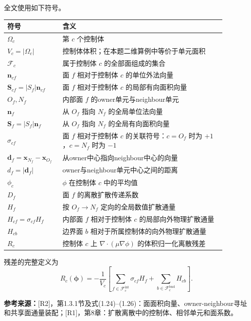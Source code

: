 \documentclass[UTF8,12pt,a4paper]{ctexart}
\numberwithin{equation}{section}
\newcommand{\Rone}{\textnormal{[R1]}}
\newcommand{\Rtwo}{\textnormal{[R2]}}
\newcommand{\source}[1]{%
  \par\smallskip
  \noindent\colorbox{sourcebg}{%
    \parbox{0.955\linewidth}{\raggedright\footnotesize\color{sourcegray}\textbf{参考来源：}#1}%
  }
  \par\smallskip
}
\newcommand{\Sf}{\bm S}
\newcommand{\xf}{\bm x}
\begin{document}
全文使用如下符号。
\begin{longtable}{>{\centering\arraybackslash}p{0.20\linewidth}p{0.69\linewidth}}
\toprule
符号 & 含义\\
\midrule
$\Omega_c$ & 第 $c$ 个控制体\\
$V_c=|\Omega_c|$ & 控制体体积；在本题二维算例中等价于单元面积\\
$\mathcal F_c$ & 属于控制体 $c$ 的全部面组成的集合\\
$\bm n_{cf}$ & 面 $f$ 相对于控制体 $c$ 的单位外法向量\\
$\Sf_{cf}=|S_f|\bm n_{cf}$ & 面 $f$ 相对于控制体 $c$ 的局部有向面积向量\\
$O_f,N_f$ & 内部面 $f$ 的owner单元与neighbour单元\\
$\bm n_f$ & 从 $O_f$ 指向 $N_f$ 的全局单位法向量\\
$\Sf_f=|S_f|\bm n_f$ & 从 $O_f$ 指向 $N_f$ 的全局有向面积向量\\
$\sigma_{cf}$ & 面 $f$ 相对于控制体 $c$ 的关联符号：$c=O_f$ 时为 $+1$，$c=N_f$ 时为 $-1$\\
$\bm d_f=\xf_{N_f}-\xf_{O_f}$ & 从owner中心指向neighbour中心的向量\\
$d_f=|\bm d_f|$ & owner与neighbour单元中心之间的距离\\
$\phi_c$ & $\phi$ 在控制体 $c$ 中的平均值\\
$D_f$ & 面 $f$ 的离散扩散传递系数\\
$H_f$ & 按 $O_f\to N_f$ 定向的全局数值扩散通量\\
$H_{cf}=\sigma_{cf}H_f$ & 内部面 $f$ 相对于控制体 $c$ 的局部向外物理扩散通量\\
$H_{cb}$ & 边界面 $b$ 相对于所属控制体的向外物理扩散通量\\
$R_c$ & 控制体 $c$ 上 $\nabla\cdot(\mu\nabla\phi)$ 的体积归一化离散残差\\
\bottomrule
\end{longtable}

残差的完整定义为
\begin{equation}
  \boxed{
  R_c(\bm\phi)
  =
  -\frac{1}{V_c}
  \left[
  \sum_{f\in\mathcal F_c^{\mathrm{int}}}\sigma_{cf}H_f
  +
  \sum_{b\in\mathcal F_c^{\mathrm{bnd}}}H_{cb}
  \right].}
  \label{eq:residual_symbol_definition}
\end{equation}

\source{\Rtwo，第1.3.1节及式(1.24)--(1.26)：面面积向量、owner-neighbour寻址和共享面通量装配；\Rone，第8章：扩散离散中的控制体、相邻单元和面系数。}
\end{document}
